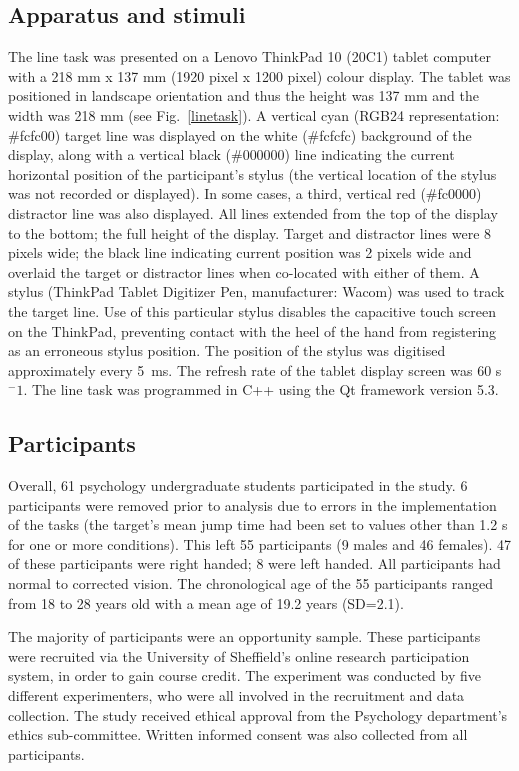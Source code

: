 \documentclass[10pt,letterpaper]{article}
\begin{document}
\subsection*{Apparatus and stimuli}
The line task was presented on a Lenovo ThinkPad 10 (20C1) tablet
computer with a 218 mm x 137 mm (1920 pixel x 1200 pixel) colour
display. The tablet was positioned in landscape orientation and thus
the height was 137 mm and the width was 218 mm (see
Fig.~\ref{linetask}). A vertical cyan (RGB24 representation: \#fcfc00)
target line was displayed on the white (\#fcfcfc) background of the
display, along with a vertical black (\#000000) line indicating the
current horizontal position of the participant's stylus (the vertical
location of the stylus was not recorded or displayed). In some cases,
a third, vertical red (\#fc0000) distractor line was also
displayed. All lines extended from the top of the display to the
bottom; the full height of the display. Target and distractor lines
were 8 pixels wide; the black line indicating current position was 2
pixels wide and overlaid the target or distractor lines when
co-located with either of them. A stylus (ThinkPad Tablet Digitizer
Pen, manufacturer: Wacom) was used to track the target line. Use of
this particular stylus disables the capacitive touch screen on the
ThinkPad, preventing contact with the heel of the hand from
registering as an erroneous stylus position. The position of the
stylus was digitised approximately every 5~ms.
The refresh rate of the tablet display screen was 60 s$^-1$. The line
task was programmed in C++ using the Qt framework version 5.3.

\subsection*{Participants}
Overall, 61 psychology undergraduate students participated in the
study. 6 participants were removed prior to analysis due to errors in
the implementation of the tasks (the target's mean jump time had been
set to values other than 1.2 s for one or more conditions). This left
55 participants (9 males and 46 females). 47 of these participants
were right handed; 8 were left handed. All participants
had normal to corrected vision. The chronological age of the 55
participants ranged from 18 to 28 years old with a mean age of 19.2
years (SD=2.1).

The majority of participants were an opportunity sample. These
participants were recruited via the University of Sheffield's online
research participation system, in order to gain course credit.  The
experiment was conducted by five different experimenters, who were all
involved in the recruitment and data collection. The study received
ethical approval from the Psychology department's ethics
sub-committee. Written informed consent was also collected from all
participants.
\end{document}

